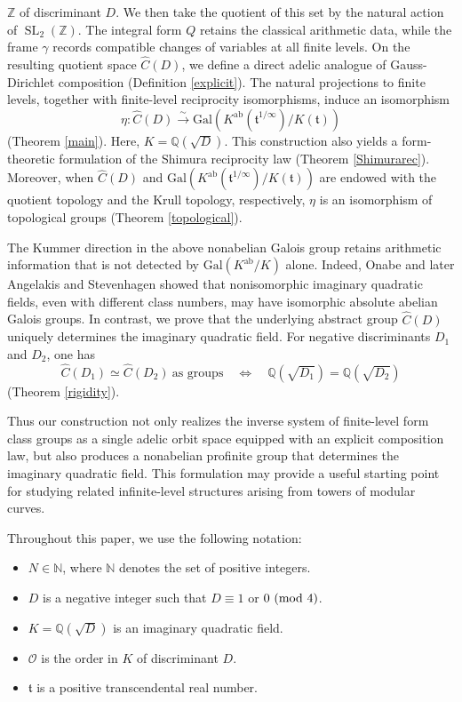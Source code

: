 \documentclass[reqno,11pt]{article}
\newcommand{\Mod}[1]{\ (\textup{mod}\ #1)}
\theoremstyle{plain} %
\theoremstyle{definition} %
\begin{document}
$\mathbb{Z}$ of discriminant $D$. We then take the quotient 
of this set by the natural action of $\operatorname{SL}_2(\mathbb{Z})$. The integral form $Q$ retains the classical arithmetic data, while the frame $\gamma$ records compatible changes of variables at all finite levels.
On the resulting quotient space $\widehat{C}(D)$, we define
a direct adelic analogue of Gauss-Dirichlet composition 
(Definition \ref{explicit}). The natural projections to finite levels,
together with finite-level reciprocity isomorphisms, induce an isomorphism
\begin{equation*}
\eta:\widehat{C}(D)
\stackrel{\sim}{\rightarrow}\mathrm{Gal}\left(K^\mathrm{ab}(\mathfrak{t}^{1/\infty})/K(\mathfrak{t})\right)
\end{equation*}
(Theorem \ref{main}). Here, $K=\mathbb{Q}(\sqrt{D})$. 
This construction also yields a form-theoretic formulation of
the Shimura reciprocity law (Theorem \ref{Shimurarec}). 
Moreover,  
when $\widehat{C}(D)$ and $\mathrm{Gal}
\left(K^\mathrm{ab}(\mathfrak{t}^{1/\infty})/K(\mathfrak{t})\right)$
are endowed with the quotient topology and the Krull topology, respectively,
$\eta$ is an isomorphism of topological groups (Theorem \ref{topological}). 
\par
The Kummer direction in the above nonabelian Galois group retains
arithmetic information that is not detected by $\mathrm{Gal}(K^\mathrm{ab}/K)$ alone.
Indeed, Onabe \cite{Onabe} and later Angelakis and Stevenhagen \cite{A-S}
showed that
nonisomorphic imaginary quadratic fields, even with different class numbers, 
may have isomorphic absolute abelian Galois groups.
In contrast, we prove that the underlying abstract group 
$\widehat{C}(D)$ uniquely determines the imaginary quadratic field. For negative
discriminants $D_1$ and $D_2$, one has
\begin{equation*}
\widehat{C}(D_1)\simeq\widehat{C}(D_2)~\textrm{as groups}
\quad\Longleftrightarrow\quad
\mathbb{Q}(\sqrt{D_1})=\mathbb{Q}(\sqrt{D_2})
\end{equation*}
(Theorem \ref{rigidity}).
\par
Thus our construction not only realizes the inverse system of
finite-level form class groups as a single adelic orbit space equipped
with an explicit composition law, but also produces a nonabelian
profinite group that determines the
imaginary quadratic field. This formulation may provide a useful
starting point for studying related infinite-level structures arising
from towers of modular curves.
\par
\bigskip
Throughout this paper, we use the following notation:
\begin{itemize}[noitemsep]
\item $N\in\mathbb{N}$, where $\mathbb{N}$ denotes the set of positive integers.
\item $D$ is a negative integer such that $D\equiv1$ or $0\Mod{4}$. 
\item $K=\mathbb{Q}(\sqrt{D})$ is an imaginary quadratic field.
\item $\mathcal{O}$ is the order in $K$ of discriminant $D$.
\item $\mathfrak{t}$ is a positive transcendental real number.
\end{itemize}
\end{document}
